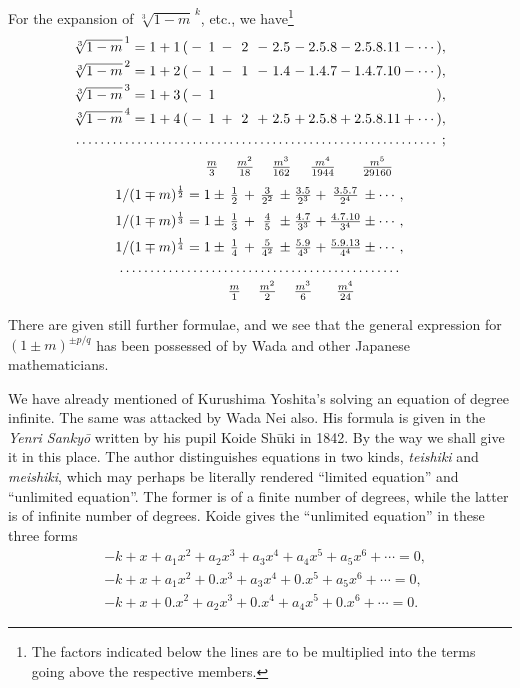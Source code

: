 \documentclass[11pt]{article}
\newcommand{\scanpage}[2]{\clearpage\setcounter{footnote}{0}\noindent{\footnotesize\color{gray}PDF page #1 · #2}\par\medskip}
\begin{document}
\scanpage{0289}{printed page 275}
For the expansion of $\sqrt[3]{1-m}^{\,k}$, etc., we have\footnote{The factors indicated below the lines are to be multiplied into the terms going above the respective members.}
\[
\begin{array}{l@{}c@{}c@{}c@{}c@{}c@{}c@{}c@{}c@{}c@{}c@{}r}
\sqrt[3]{1-m}^{\,1} = 1 + 1\,( & {}-{} & 1 & {}-{} & 2 & {}-{} & 2.5 & {}-{} & 2.5.8 & {}-{} & 2.5.8.11 & {}-\cdots), \\[1mm]
\sqrt[3]{1-m}^{\,2} = 1 + 2\,( & {}-{} & 1 & {}-{} & 1 & {}-{} & 1.4 & {}-{} & 1.4.7 & {}-{} & 1.4.7.10 & {}-\cdots), \\[1mm]
\sqrt[3]{1-m}^{\,3} = 1 + 3\,( & {}-{} & 1 & & & & & & & & & ), \\[1mm]
\sqrt[3]{1-m}^{\,4} = 1 + 4\,( & {}-{} & 1 & {}+{} & 2 & {}+{} & 2.5 & {}+{} & 2.5.8 & {}+{} & 2.5.8.11 & {}+\cdots), \\[1mm]
\multicolumn{12}{c}{\dotfill\;;} \\[2mm]
 & & \frac{m}{3} & & \frac{m^2}{18} & & \frac{m^3}{162} & & \frac{m^4}{1944} & & \frac{m^5}{29160} &
\end{array}
\]
\[
\begin{array}{r@{}c@{}c@{}c@{}c@{}c@{}c@{}c@{}c@{}l}
1/(1\mp m)^{\frac{1}{2}} = 1 & {}\pm{} & \frac{1}{2} & {}+{} & \frac{3}{2^2} & {}\pm{} & \frac{3.5}{2^3} & {}+{} & \frac{3.5.7}{2^4} & {}\pm\cdots, \\[2mm]
1/(1\mp m)^{\frac{1}{3}} = 1 & {}\pm{} & \frac{1}{3} & {}+{} & \frac{4}{5} & {}\pm{} & \frac{4.7}{3^3} & {}+{} & \frac{4.7.10}{3^4} & {}\pm\cdots, \\[2mm]
1/(1\mp m)^{\frac{1}{4}} = 1 & {}\pm{} & \frac{1}{4} & {}+{} & \frac{5}{4^2} & {}\pm{} & \frac{5.9}{4^3} & {}+{} & \frac{5.9.13}{4^4} & {}\pm\cdots, \\[1mm]
\multicolumn{10}{c}{\dotfill} \\[1mm]
 & & \frac{m}{1} & & \frac{m^2}{2} & & \frac{m^3}{6} & & \frac{m^4}{24} &
\end{array}
\]

There are given still further formulae, and we see that the general expression for $(1 \pm m)^{\pm p/q}$ has been possessed of by Wada and other Japanese mathematicians.

We have already mentioned of Kurushima Yoshita's solving an equation of degree infinite. The same was attacked by Wada Nei also. His formula is given in the \emph{Yenri Sankyō} written by his pupil Koide Shūki in 1842. By the way we shall give it in this place. The author distinguishes equations in two kinds, \emph{teishiki} and \emph{meishiki}, which may perhaps be literally rendered ``limited equation'' and ``unlimited equation''. The former is of a finite number of degrees, while the latter is of infinite number of degrees. Koide gives the ``unlimited equation'' in these three forms
\[
\begin{aligned}
&-k + x + a_1x^2 + a_2x^3 + a_3x^4 + a_4x^5 + a_5x^6 + \cdots = 0,\\
&-k + x + a_1x^2 + 0.x^3 + a_3x^4 + 0.x^5 + a_5x^6 + \cdots = 0,\\
&-k + x + 0.x^2 + a_2x^3 + 0.x^4 + a_4x^5 + 0.x^6 + \cdots = 0.
\end{aligned}
\]
\end{document}
